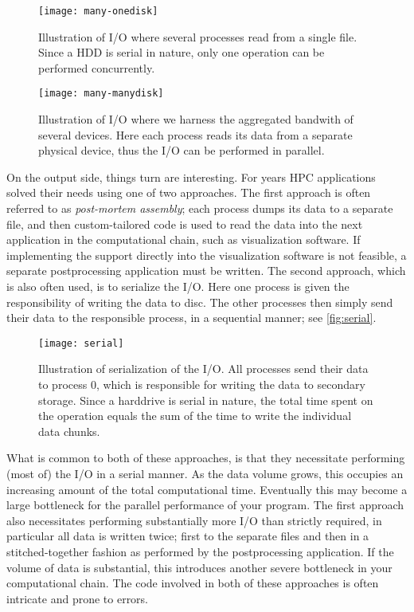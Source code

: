 \begin{figure}
  \begin{center}
    \texttt{[image: many-onedisk]}
  \end{center}
  \caption{
    Illustration of I/O where several processes read from a single file. Since a
    HDD is serial in nature, only one operation can be performed concurrently.
  }
  \label{fig:manyone}
\end{figure}
\begin{figure}
  \begin{center}
    \texttt{[image: many-manydisk]}
  \end{center}
  \caption{
    Illustration of I/O where we harness the aggregated bandwith of several
    devices. Here each process reads its data from a separate physical device,
    thus the I/O can be performed in parallel.
  }
  \label{fig:manymany}
\end{figure}

On the output side, things turn are interesting. For years HPC applications
solved their needs using one of two approaches. The first approach is often
referred to as \emph{post-mortem assembly}; each process dumps its data to a
separate file, and then custom-tailored code is used to read the data into the
next application in the computational chain, such as visualization software. If
implementing the support directly into the visualization software is not
feasible, a separate postprocessing application must be written. The second
approach, which is also often used, is to serialize the I/O. Here one process is
given the responsibility of writing the data to disc. The other processes then
simply send their data to the responsible process, in a sequential manner; see
\autoref{fig:serial}.

\begin{figure}
  \begin{center}
    \texttt{[image: serial]}
  \end{center}
  \caption{
    Illustration of serialization of the I/O. All processes send their data to
    process 0, which is responsible for writing the data to secondary storage.
    Since a harddrive is serial in nature, the total time spent on the operation
    equals the sum of the time to write the individual data chunks.
  }
  \label{fig:serial}
\end{figure}

What is common to both of these approaches, is that they necessitate performing
(most of) the I/O in a serial manner. As the data volume grows, this occupies an
increasing amount of the total computational time. Eventually this may become a
large bottleneck for the parallel performance of your program. The first
approach also necessitates performing substantially more I/O than strictly
required, in particular all data is written twice; first to the separate files
and then in a stitched-together fashion as performed by the postprocessing
application. If the volume of data is substantial, this introduces another
severe bottleneck in your computational chain. The code involved in both of
these approaches is often intricate and prone to errors.


